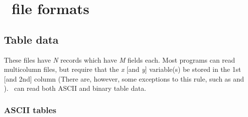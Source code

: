 %
%

\chapter{\gmt\ file formats}
\thispagestyle{headings}

\section{Table data} 

These files have {\it N} records which have {\it M} fields each.
Most programs can read multicolumn files, but require that the
{\it x} [and {\it y}] variable(s) be stored in the 1st [and 2nd]
column (There are, however, some exceptions to this rule, such as
 and ).  \GMT\ can read both ASCII and
binary table data.

\subsection{ASCII tables}

